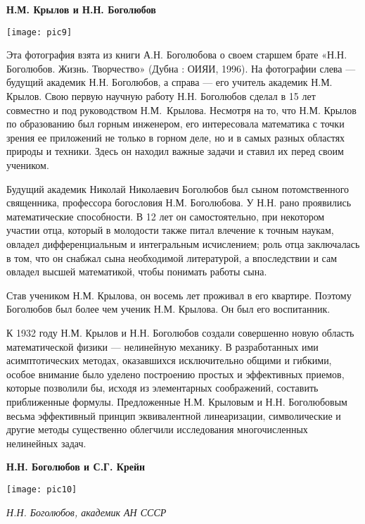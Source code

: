 \begin{center}
{\bf Н.М. Крылов и Н.Н. Боголюбов}

\vspace{3mm}

\texttt{[image: pic9]}

\end{center}

Эта фотография взята из книги А.Н. Боголюбова о своем старшем брате «Н.Н. Боголюбов. Жизнь. Творчество» (Дубна : ОИЯИ, 1996). На фотографии слева — будущий академик Н.Н. Боголюбов, а справа — его учитель академик Н.М. Крылов. Свою первую научную работу Н.Н. Боголюбов сделал в 15 лет совместно и под руководством Н.М.~Крылова. Несмотря на то, что Н.М. Крылов по образованию был горным инженером, его интересовала математика с точки зрения ее приложений не только в горном деле, но и в самых разных областях природы и техники. Здесь он находил важные задачи и ставил их перед своим учеником.

Будущий академик Николай Николаевич Боголюбов был сыном потомственного священника, профессора богословия Н.М. Боголюбова. У Н.Н. рано проявились математические способности. В 12 лет он самостоятельно, при некотором участии отца, который в молодости также питал влечение к точным наукам, овладел дифференциальным и интегральным исчислением; роль отца заключалась в том, что он снабжал сына необходимой литературой, а впоследствии и сам овладел высшей математикой, чтобы понимать работы сына.

Став учеником Н.М. Крылова, он восемь лет проживал в его квартире. Поэтому Боголюбов был более чем ученик Н.М. Крылова. Он был его воспитанник.

 К 1932 году Н.М. Крылов и Н.Н. Боголюбов создали совершенно новую область математической физики — нелинейную механику. В разработанных ими асимптотических методах, оказавшихся исключительно общими и гибкими, особое внимание было уделено построению простых и эффективных приемов, которые позволили бы, исходя из элементарных соображений, составить приближенные формулы. Предложенные Н.М. Крыловым и Н.Н. Боголюбовым весьма эффективный принцип эквивалентной линеаризации, символические и другие методы существенно облегчили исследования многочисленных нелинейных задач.

\begin{center}
{\bf Н.Н. Боголюбов и С.Г. Крейн}

\texttt{[image: pic10]}


{\it Н.Н. Боголюбов, академик АН СССР}
\end{center}


